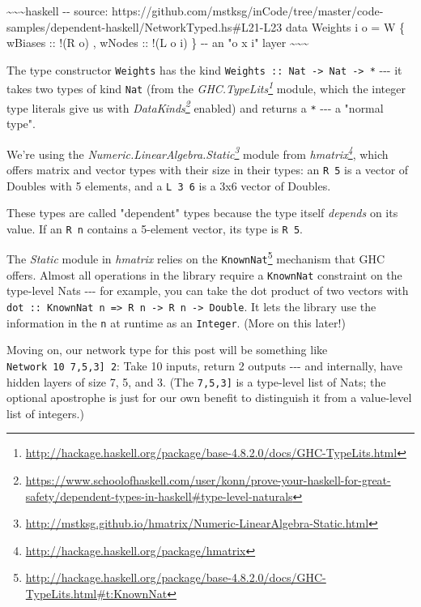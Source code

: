 \documentclass[]{article}
\renewcommand{\href}[2]{#2\footnote{\url{#1}}}
\begin{document}
\textasciitilde{}\textasciitilde{}\textasciitilde{}haskell -\/- source:
https://github.com/mstksg/inCode/tree/master/code-samples/dependent-haskell/NetworkTyped.hs\#L21-L23
data Weights i o = W \{ wBiases :: !(R o) , wNodes :: !(L o i) \} -\/- an "o x
i" layer \textasciitilde{}\textasciitilde{}\textasciitilde{}

The type constructor \texttt{Weights} has the kind
\texttt{Weights\ ::\ Nat\ -\textgreater{}\ Nat\ -\textgreater{}\ *} -\/-\/- it
takes two types of kind \texttt{Nat} (from the
\emph{\href{http://hackage.haskell.org/package/base-4.8.2.0/docs/GHC-TypeLits.html}{GHC.TypeLits}}
module, which the integer type literals give us with
\emph{\href{https://www.schoolofhaskell.com/user/konn/prove-your-haskell-for-great-safety/dependent-types-in-haskell\#type-level-naturals}{DataKinds}}
enabled) and returns a \texttt{*} -\/-\/- a "normal type".

We're using the
\emph{\href{http://mstksg.github.io/hmatrix/Numeric-LinearAlgebra-Static.html}{Numeric.LinearAlgebra.Static}}
module from \emph{\href{http://hackage.haskell.org/package/hmatrix}{hmatrix}},
which offers matrix and vector types with their size in their types: an
\texttt{R\ 5} is a vector of Doubles with 5 elements, and a \texttt{L\ 3\ 6} is
a 3x6 vector of Doubles.

These types are called "dependent" types because the type itself \emph{depends}
on its value. If an \texttt{R\ n} contains a 5-element vector, its type is
\texttt{R\ 5}.

The \emph{Static} module in \emph{hmatrix} relies on the
\href{http://hackage.haskell.org/package/base-4.8.2.0/docs/GHC-TypeLits.html\#t:KnownNat}{\texttt{KnownNat}}
mechanism that GHC offers. Almost all operations in the library require a
\texttt{KnownNat} constraint on the type-level Nats -\/-\/- for example, you can
take the dot product of two vectors with
\texttt{dot\ ::\ KnownNat\ n\ =\textgreater{}\ R\ n\ -\textgreater{}\ R\ n\ -\textgreater{}\ Double}.
It lets the library use the information in the \texttt{n} at runtime as an
\texttt{Integer}. (More on this later!)

Moving on, our network type for this post will be something like
\texttt{Network\ 10\ \textquotesingle{}{[}7,5,3{]}\ 2}: Take 10 inputs, return 2
outputs -\/-\/- and internally, have hidden layers of size 7, 5, and 3. (The
\texttt{\textquotesingle{}{[}7,5,3{]}} is a type-level list of Nats; the
optional \texttt{\textquotesingle{}} apostrophe is just for our own benefit to
distinguish it from a value-level list of integers.)
\end{document}
